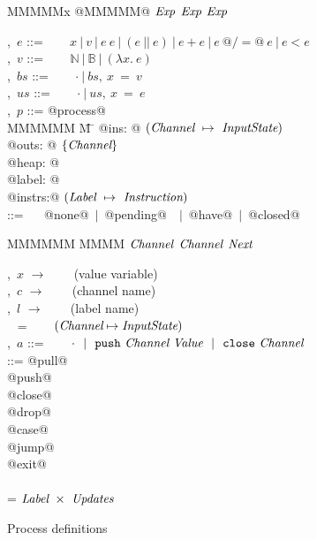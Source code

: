 
\begin{figure}
\begin{center}
\begin{minipage}[t]{0.4\textwidth}
\begin{tabbing}
MMMMMx \TABDEF @MMMMM@  \TABSKIP $\textit{Exp}$ \TABSKIP $\textit{Exp}$ \TABSKIP $\textit{Exp}$ \kill

\Exp,~$e$       \> ::= \> ~~~ $x~|~v~|~e~e ~|~ (e~||~e) ~|~ e+e ~|~ e~@/=@~e ~|~ e < e$ \\
\Value,~$v$     \> ::= \> ~~~ $\mathbb{N}~|~\mathbb{B}~|~(\lambda{}x.~e)$ \\
\Heap,~$bs$     \> ::= \> ~~~ $\cdot~|~bs,~x~=~v$ \\
\Updates,~$us$  \> ::= \> ~~~ $\cdot~|~us,~x~=~e$
\\[0.5em]

\Proc,~$p$      \> ::=\> @process@ \\
MMMMMM \= M \= \kill
\> \> @ins:   @  $(\textit{Channel} ~\mapsto~ \textit{InputState})$ \\
\> \> @outs:  @  $\{ \textit{Channel} \}$ \\
\> \> @heap:  @  \Heap \\
\> \> @label: @  \Label \\
\> \> @instrs:@  $(\textit{Label} ~\mapsto~ \textit{Instruction})$ 
\\[0.5em]
\InputState \> ::= \> ~~ @none@~$|$~@pending@~\Value~$|$~@have@~$|$~@closed@
\end{tabbing}

\begin{tabbing}
MMMMMM \TABDEF MMMM \TABSKIP $\textit{Channel}$ \TABSKIP $\textit{Channel}$ \TABSKIP $\textit{Next}$ \TABSKIP \kill

\Var,~$x$       \> $\to$ \> ~~~ (value variable) \\
\Chan,~$c$      \> $\to$ \> ~~~ (channel name) \\
\Label,~$l$     \> $\to$ \> ~~~ (label name) \\ 
\ChannelStates  \> ~ =   \> ~~~ $(\textit{Channel} \mapsto \textit{InputState})$ \\
\Action,~$a$   \> ::=    \> ~~~ $\cdot ~~|~~ \texttt{push}~\textit{Channel}~\textit{Value} ~~|~~ \texttt{close}~\textit{Channel}$ \\[0.5em]

\Instr
    \> ::=\> @pull@  \> \Chan  \> \Var  \> \Next \> \Next \\
    \TABALT  @push@  \> \Chan  \> \Exp  \> \Next \\
    \TABALT  @close@ \> \Chan  \>       \> \Next \\
    \TABALT  @drop@  \> \Chan  \>       \> \Next \\
    \TABALT  @case@  \> \Exp   \> \Next \> \Next \\
    \TABALT  @jump@  \>        \>       \> \Next \\
    \TABALT  @exit@  \\
\\[0.5em]

\Next \> = \> $\textit{Label}~\times~\textit{Updates}$ 
\end{tabbing}
\end{minipage}
\end{center}
\caption{Process definitions}
\label{fig:Process:Def}
\end{figure}

